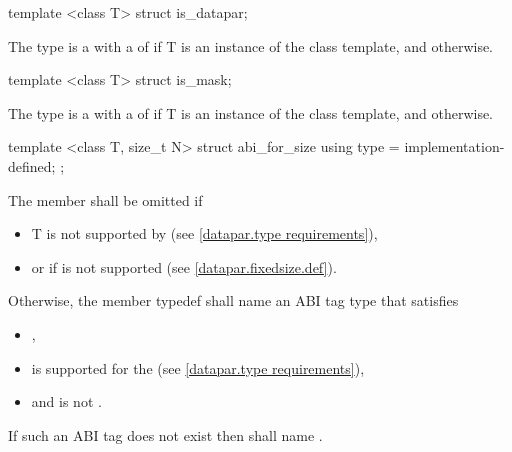 \begin{itemdecl}
template <class T> struct is_datapar;
\end{itemdecl}
\begin{itemdescr}
  \pnum The type  is a \UnaryTypeTrait with a \BaseCharacteristic of  if \type T is an instance of the \datapar class template, and  otherwise.
\end{itemdescr}

\begin{itemdecl}
template <class T> struct is_mask;
\end{itemdecl}
\begin{itemdescr}
  \pnum The type  is a \UnaryTypeTrait with a \BaseCharacteristic of  if \type T is an instance of the \mask class template, and  otherwise.
\end{itemdescr}

\begin{itemdecl}
template <class T, size_t N> struct abi_for_size { using type = implementation-defined; };
\end{itemdecl}
\begin{itemdescr}
  \pnum The member  shall be omitted if
  \begin{itemize}
    \item \type T is not supported by \datapar (see \ref{datapar.type requirements}),
    \item or if \fixedsizeN is not supported (see \ref{datapar.fixedsize.def}).
  \end{itemize}

  \pnum Otherwise, the member typedef  shall name an ABI tag type that satisfies
  \begin{itemize}
    \item {},
    \item \datapar[<T, type>] is supported for the \currentTarget (see \ref{datapar.type requirements}),
    \item and  is not \fixedsizeN.
  \end{itemize}
  If such an ABI tag does not exist then  shall name \fixedsizeN.
\end{itemdescr}

